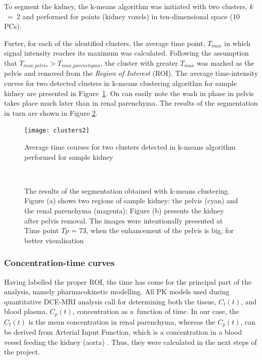 \vspace{16pt}
To segment the kidney, the k-means algorithm was initiated with two clusters, $k$~=~2 and performed for points (kidney voxels) in ten-dimensional space (10 PCs).

Furter, for each of the identified clusters, the average time point, $T_{max}$ in which signal intensity reaches its maximum was calculated. 
Following the assumption that $T_{max\_pelvis}>T_{max\_parenchyma}$, the cluster with greater $T_{max}$ was marked as the pelvis and removed from the \textit{Region of Interest} (ROI).
The average time-intensity curves for two detected clusters in k-means clustering algorithm for sample kidney are presented in Figure~\ref{fig:clusters}. On can easily note the wash in phase in pelvis takes place much later than in renal parenchyma. The results of the segmentation in turn are shown in Figure \ref{fig:segmentation}.  


\begin{figure}[H]
	\centering
	\texttt{[image: clusters2]}
	
\caption[Average time courses for two clusters detected in k-means algorithm]{Average time courses for two clusters detected in k-means algorithm performed for sample kidney}
\label{fig:clusters}
\end{figure}

\begin{figure}[H]
\captionsetup[subfloat]{captionskip=0.5cm}
	\centering
	\hspace{0.02\textwidth}
	\\	
\vspace{0.5cm}
\caption[Sample kidney segmentation with k-means clustering]{The results of the segmentation obtained with k-means clustering. Figure (a) shows two regions of sample kidney: the pelvis (cyan) and the renal parenchyma (magenta); Figure (b) presents the kidney after pelvis removal. The images were intentionally presented at Time point $Tp$ = 73, when the enhancement of the pelvis is big, for better visualisation}
\label{fig:segmentation}
\end{figure}

\subsubsection{Concentration-time curves}
Having labelled the proper ROI, the time has come for the principal part of the analysis, namely pharmacokinetic modelling.
All PK models used during quantitative DCE-MRI analysis call for determining both the tissue, $C_t(t)$, and blood plasma, $C_p(t)$, concentration as a~function of time. In our case, the $C_t(t)$ is the mean concentration in renal parenchyma, whereas the
$C_p(t)$, can be derived from  Arterial Input Function, which is a concentration in a blood vessel feeding the kidney (aorta) \cite{khalifa2014models}. 
Thus, they were calculated in the next steps of the project.  

